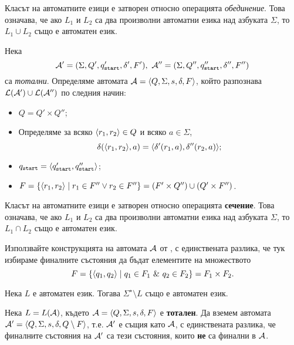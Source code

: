 \begin{prop}
  \label{pr:automata-union}
  Класът на автоматните езици е затворен относно операцията {\em обединение}.
  Това означава, че ако $L_1$ и $L_2$ са два произволни автоматни езика над азбуката $\Sigma$, то $L_1\cup L_2$
  също е автоматен език.
\end{prop}
\begin{hint}
  Нека \[\mathcal{A}' = (\Sigma,Q',q_{\texttt{start}}',\delta',F'),\ \mathcal{A}'' = (\Sigma, Q'', q_{\texttt{start}}'', \delta'', F'')\] са {\em тотални}.
  Определяме автомата $\mathcal{A} = \langle{Q,\Sigma,s,\delta,F}\rangle$, който разпознава $\mathcal{L}(\mathcal{A}') \cup \mathcal{L}(\mathcal{A}'')$ по следния начин:
  \begin{itemize}
  \item
    $Q = Q'\times Q''$;
  \item
    Определяме за всяко $\langle{r_1,r_2}\rangle \in Q$ и всяко $a \in \Sigma$,
    \[\delta(\langle{r_1,r_2}\rangle,a) = \langle{\delta'(r_1,a),\delta''(r_2,a)}\rangle;\]
  \item
    $q_{\texttt{start}} = \langle{q_{\texttt{start}}',q_{\texttt{start}}''}\rangle$;
  \item
    $F = \{\langle{r_1,r_2}\rangle\mid r_1\in F'' \vee r_2 \in F''\} = (F'\times Q'')\cup (Q'\times F'')$.
  \end{itemize}
\end{hint}

\begin{cor}
  Класът на автоматните езици е затворен относно операцията {\bf сечение}.
  Това означава, че ако $L_1$ и $L_2$ са два произволни автоматни езика над азбуката $\Sigma$, то $L_1\cap L_2$
  също е автоматен език.
\end{cor}
\begin{hint}
  Използвайте конструкцията на автомата $\mathcal{A}$ от ,
  с единствената разлика, че тук избираме финалните състояния да бъдат елементите на множеството
  \[F = \{\pair{q_1,q_2} \mid q_1 \in F_1\ \&\ q_2 \in F_2\} = F_1\times F_2.\]
\end{hint}

\begin{prop}
  \label{pr:automata-complement}
  Нека $L$ е автоматен език.
  Тогава $\Sigma^\star\setminus L$ също е автоматен език.
\end{prop}
\begin{hint}
  Нека $L = L(\mathcal{A})$, където $\mathcal{A} = \langle{Q,\Sigma,s,\delta,F}\rangle$ е {\bf тотален}.
  Да вземем автомата $\mathcal{A}' = \langle{Q,\Sigma,s,\delta,Q\setminus F}\rangle$,
  т.е. $\mathcal{A}'$ е същия като $\mathcal{A}$, с единствената разлика, че финалните състояния на $\mathcal{A}'$
  са тези състояния, които {\bf не} са финални в $\mathcal{A}$.
\end{hint}



